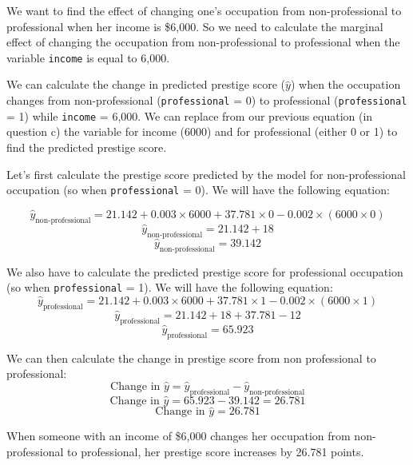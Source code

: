 \documentclass[12pt,letterpaper]{article}
\begin{document}
\begin{enumerate}
	\vspace{0.2cm}
	We want to find the effect of changing one's occupation from non-professional to professional when her income is \$6,000. 
	So we need to calculate the marginal effect of changing the occupation from non-professional to professional when the variable \texttt{income}  is equal to 6,000.
	
	We can calculate the change in predicted prestige score (\( \hat{y} \)) when the occupation changes from non-professional (\texttt{professional} = 0) to professional (\texttt{professional} = 1) while \texttt{income} = 6,000. 
	We can replace from our previous equation (in question c) the variable for income (6000) and for professional (either 0 or 1) to find the predicted prestige score.
	
	Let's first calculate the prestige score predicted by the model for non-professional occupation (so when \texttt{professional} = 0). We will have the following equation:
	
	\[
	\hat{y}_{\text{non-professional}} = 21.142 + 0.003 \times 6000 + 37.781 \times 0 - 0.002 \times (6000 \times 0)
	\]
	\[
	\hat{y}_{\text{non-professional}} = 21.142 + 18
	\]
	\[
	\hat{y}_{\text{non-professional}} = 39.142
	\]
	
	We also have to calculate the predicted prestige score for professional occupation (so when \texttt{professional} = 1). We will have the following equation:	
	\[
	\hat{y}_{\text{professional}} = 21.142 + 0.003 \times 6000 + 37.781 \times 1 - 0.002 \times (6000 \times 1)
	\]
	\[
	\hat{y}_{\text{professional}} = 21.142 + 18 + 37.781 - 12
	\]
	\[
	\hat{y}_{\text{professional}} = 65.923
	\]
	
	We can then calculate the change in prestige score from non professional to professional:
	\[
	\text{Change in } \hat{y} = \hat{y}_{\text{professional}} - \hat{y}_{\text{non-professional}} 
	\]
	\[
	\text{Change in } \hat{y} = 65.923 - 39.142 = 26.781
	\]
	\[
	\text{Change in } \hat{y} = 26.781
	\]
	
	 When someone with an income of \$6,000 changes her occupation from non-professional to professional, her prestige score increases by 26.781 points.
	
	
	
\end{enumerate}

\newpage
\end{document}
